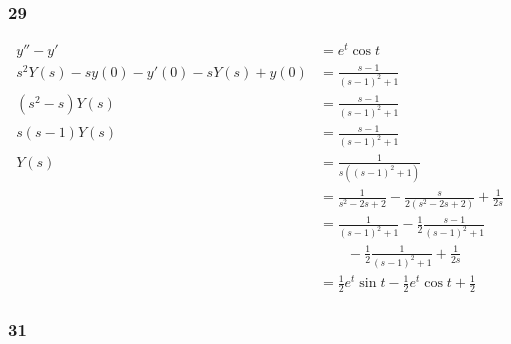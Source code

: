 \documentclass{article}
\begin{document}
\subsubsection{29}

\begin{align*}
  y'' - y'                                  & = e^t \cos t                                                            \\
  s^2 Y(s) - s y(0) - y'(0) - s Y(s) + y(0) & = \frac{s - 1}{(s - 1)^2 + 1}                                           \\
  (s^2 - s) Y(s)                            & = \frac{s - 1}{(s - 1)^2 + 1}                                           \\
  s (s - 1) Y(s)                            & = \frac{s - 1}{(s - 1)^2 + 1}                                           \\
  Y(s)                                      & = \frac{1}{s ((s - 1)^2 + 1)}                                           \\
                                            & = \frac{1}{s^2 - 2 s + 2} - \frac{s}{2 (s^2 - 2 s + 2)} + \frac{1}{2 s} \\
                                            & = \frac{1}{(s - 1)^2 + 1} - \frac{1}{2} \frac{s - 1}{(s - 1)^2 + 1}     \\
                                            & \qquad - \frac{1}{2} \frac{1}{(s - 1)^2 + 1} + \frac{1}{2s}             \\
                                            & = \frac{1}{2} e^t \sin t - \frac{1}{2} e^t \cos t + \frac{1}{2}
\end{align*}

\subsubsection{31}
\end{document}
